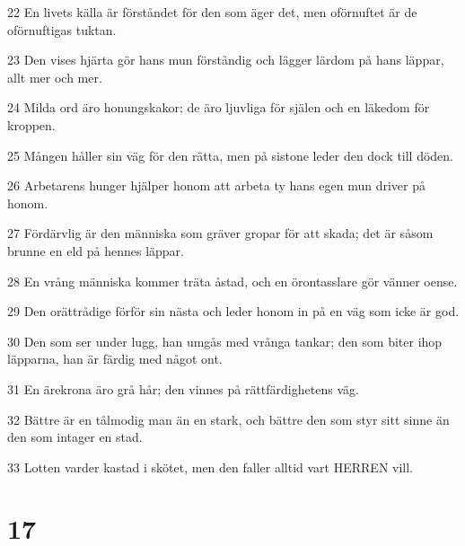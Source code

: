 \par 22 En livets källa är förståndet för den som äger det, men oförnuftet är de oförnuftigas tuktan.
\par 23 Den vises hjärta gör hans mun förståndig och lägger lärdom på hans läppar, allt mer och mer.
\par 24 Milda ord äro honungskakor; de äro ljuvliga för själen och en läkedom för kroppen.
\par 25 Mången håller sin väg för den rätta, men på sistone leder den dock till döden.
\par 26 Arbetarens hunger hjälper honom att arbeta ty hans egen mun driver på honom.
\par 27 Fördärvlig är den människa som gräver gropar för att skada; det är såsom brunne en eld på hennes läppar.
\par 28 En vrång människa kommer träta åstad, och en örontasslare gör vänner oense.
\par 29 Den orättrådige förför sin nästa och leder honom in på en väg som icke är god.
\par 30 Den som ser under lugg, han umgås med vrånga tankar; den som biter ihop läpparna, han är färdig med något ont.
\par 31 En ärekrona äro grå hår; den vinnes på rättfärdighetens väg.
\par 32 Bättre är en tålmodig man än en stark, och bättre den som styr sitt sinne än den som intager en stad.
\par 33 Lotten varder kastad i skötet, men den faller alltid vart HERREN vill.

\chapter{17}

